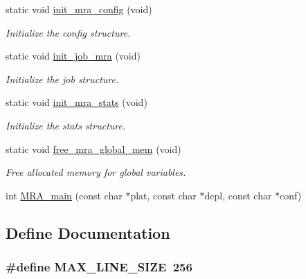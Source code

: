 \begin{DoxyCompactItemize}
static void \hyperlink{simcore-mra_8c_a304f53ce22aa109f079f9c3e8c521dbc}{init\-\_\-mra\-\_\-config} (void)
\begin{DoxyCompactList}\small\item\em \-Initialize the config structure. \end{DoxyCompactList}\item 
static void \hyperlink{simcore-mra_8c_ab6bf4d820598c4e044bd5a5430fa7047}{init\-\_\-job\-\_\-mra} (void)
\begin{DoxyCompactList}\small\item\em \-Initialize the job structure. \end{DoxyCompactList}\item 
static void \hyperlink{simcore-mra_8c_a09cdc84e35f029d7393f59d8f19fa06e}{init\-\_\-mra\-\_\-stats} (void)
\begin{DoxyCompactList}\small\item\em \-Initialize the stats structure. \end{DoxyCompactList}\item 
static void \hyperlink{simcore-mra_8c_a03e19a36bc82e880b5e652b2967f2721}{free\-\_\-mra\-\_\-global\-\_\-mem} (void)
\begin{DoxyCompactList}\small\item\em \-Free allocated memory for global variables. \end{DoxyCompactList}\item 
int \hyperlink{simcore-mra_8c_a002d713ab68756c7102fdf5d914a30da}{\-M\-R\-A\-\_\-main} (const char $\ast$plat, const char $\ast$depl, const char $\ast$conf)
\end{DoxyCompactItemize}


\subsection{\-Define \-Documentation}
\hypertarget{simcore-mra_8c_a706068f562dd5c64a8b7bbd4b2298dd1}{
\subsubsection[{\-M\-A\-X\-\_\-\-L\-I\-N\-E\-\_\-\-S\-I\-Z\-E}]{\setlength{\rightskip}{0pt plus 5cm}\#define {\bf \-M\-A\-X\-\_\-\-L\-I\-N\-E\-\_\-\-S\-I\-Z\-E}~256}}\label{simcore-mra_8c_a706068f562dd5c64a8b7bbd4b2298dd1}



